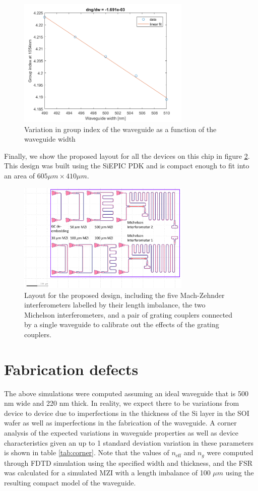 \documentclass[journal]{IEEEtran}
\begin{document}
\begin{figure}[t!]
  \centering
  \includegraphics[width = 3.25in]{fig/dngdw.png}
  \caption{Variation in group index of the waveguide as a function of the waveguide width}
  \label{fig:dngdw}
\end{figure}

Finally, we show the proposed layout for all the devices on this chip in figure \ref{fig:layout}. This design was built using the SiEPIC PDK and is compact enough to fit into an area of $605 \mu m \times 410 \mu m $.

\begin{figure}[t!]
  \centering
  \includegraphics[width = 3.25in]{fig/layout.png}
  \caption{Layout for the proposed design, including the five Mach-Zehnder interferometers labelled by their length imbalance, the two Michelson interferometers, and a pair of grating couplers connected by a single waveguide to calibrate out the effects of the grating couplers.}
  \label{fig:layout}
\end{figure}

\section{Fabrication defects}

The above simulations were computed assuming an ideal waveguide that is 500 nm wide and 220 nm thick. In reality, we expect there to be variations from device to device due to imperfections in the thickness of the Si layer in the SOI wafer as well as imperfections in the fabrication of the waveguide. A corner analysis of the expected variations in waveguide properties as well as device characteristics given an up to 1 standard deviation variation in these parameters is shown in table \ref{tab:corner}. Note that the values of $n_{\text{eff}}$ and $n_g$ were computed through FDTD simulation using the specified width and  thickness, and the FSR was calculated for a simulated MZI with a length imbalance of 100 $\mu m$ using the resulting compact model of the waveguide.
\end{document}
